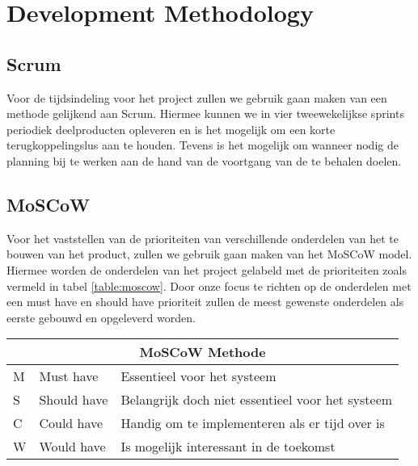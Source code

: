 \section{Development Methodology}
\subsection{Scrum}
Voor de tijdsindeling voor het project zullen we gebruik gaan maken van een methode gelijkend aan Scrum. Hiermee kunnen we in vier tweewekelijkse sprints periodiek deelproducten opleveren en is het mogelijk om een korte terugkoppelingslus aan te houden. Tevens is het mogelijk om wanneer nodig de planning bij te werken aan de hand van de voortgang van de te behalen doelen. 

\subsection{MoSCoW}
Voor het vaststellen van de prioriteiten van verschillende onderdelen van het te bouwen van het product, zullen we gebruik gaan maken van het MoSCoW model. Hiermee worden de onderdelen van het project gelabeld met de prioriteiten zoals vermeld in tabel \ref{table:moscow}. Door onze focus te richten op de onderdelen met een must have en should have prioriteit zullen de meest gewenste onderdelen als eerste gebouwd en opgeleverd worden.\\[1cm]


{\renewcommand{\arraystretch}{1.5}
	\centering
	
	\begin{tabular}{ | l | l | l | }
		\multicolumn{3}{c}{\bfseries{MoSCoW Methode}} \\ \hline
		M & Must have & Essentieel voor het systeem\\ \hline
		S & Should have & Belangrijk doch niet essentieel voor het systeem \\ \hline
		C & Could have & Handig om te implementeren als er tijd over is \\ \hline
		W & Would have & Is mogelijk interessant in de toekomst \\ \hline 
	\end{tabular}
	\label{table:moscow}
	
}
